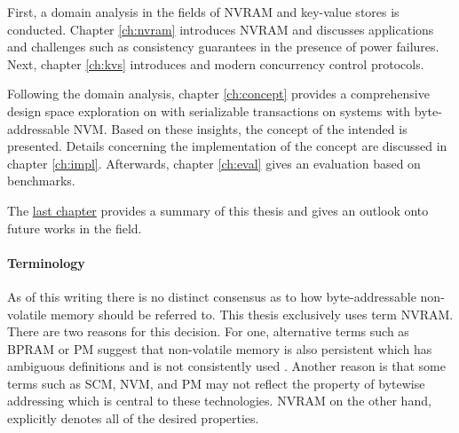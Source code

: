 First, a domain analysis in the fields of \ac{NVRAM} and key-value stores is
conducted. Chapter \ref{ch:nvram} introduces \ac{NVRAM} and discusses
applications and challenges such as consistency guarantees in the presence of
power failures. Next, chapter \ref{ch:kvs} introduces \kvsp and modern
concurrency control protocols.

Following the domain analysis, chapter \ref{ch:concept} provides a comprehensive
design space exploration on \kvsp with serializable transactions on systems with
byte-addressable \ac{NVM}. Based on these insights, the concept of the intended
\kvs is presented. Details concerning the implementation of the concept are
discussed in chapter \ref{ch:impl}. Afterwards, chapter \ref{ch:eval} gives an
evaluation based on benchmarks.

The \hyperref[ch:summary]{last chapter} provides a summary of this thesis and
gives an outlook onto future works in the field.

\paragraph{Terminology}

As of this writing there is no distinct consensus as to how byte-addressable
non-volatile memory should be referred to. This thesis exclusively uses term
NVRAM. There are two reasons for this decision. For one, alternative terms such
as BPRAM or PM suggest that non-volatile memory is also persistent which has
ambiguous definitions and is not consistently used \cite{volos2017whisper}.
Another reason is that some terms such as SCM, NVM, and PM may not reflect the
property of bytewise addressing which is central to these technologies. NVRAM on
the other hand, explicitly denotes all of the desired properties.
